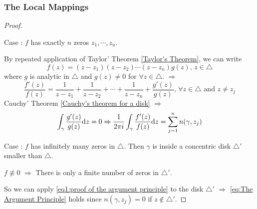 \subsubsection{The Local Mappings}
\begin{proof}
    \,

    Case \uppercase\expandafter{}:  $ f $ has exactly  $ n $ zeros  $ z_1,\cdots,z_n $.
    
    By repeated application of Taylor' Theorem \ref{Taylor's Theorem}, we can write 
    \begin{equation}
        f(z)=(z-z_1)(z-z_2)\cdots(z-z_n)g(z),\,z\in\triangle
    \end{equation}
    where  $ g $ is analytic in  $ \triangle $ and  $ g(z)\not=0 $ for  $ \forall z\in \triangle $.
    $ \Rightarrow  $
    \begin{equation}
        \frac{f'(z)}{f(z)}=\frac{1}{z-z_1}+\frac{1}{z-z_2}+\cdots+\frac{1}{z-z_n}+\frac{g'(z)}{g(z)},\,\forall z\in\triangle\text{ and }z\not=z_j
    \end{equation}  
    Cauchy' Theorem \ref{Cauchy's theorem for a disk} $ \Rightarrow $ 
    \begin{equation}
        \displaystyle\int_\gamma\frac{g'(z)}{g(z)}\mathrm{d}z=0 \Rightarrow  \displaystyle\frac{1}{2\pi i}\int_\gamma\frac{f'(z)}{f(z)}\mathrm{d}z=\displaystyle\sum_{j=1}^nn(\gamma,z_j)\label{eq1:proof of the argument principle}
    \end{equation}  
    
    Case \uppercase\expandafter{}:  $ f $ has infinitely many zeros in  $ \triangle $. Then  $ \gamma $ is inside a concentric disk  $ \triangle' $ smaller than  $ \triangle $.

    $ f\not\equiv 0 $ $ \Rightarrow $ There is only a finite number of zeros in  $ \triangle' $.
    
    So we can apply \eqref{eq1:proof of the argument principle} to the disk  $ \triangle' $  $ \Rightarrow $ \eqref{eq:The Argument Principle} holds since  $ n(\gamma,z_j)=0 $ if  $ z\not\in\triangle' $.  
\end{proof}
